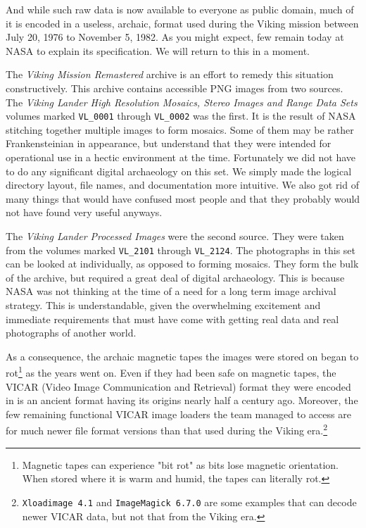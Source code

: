 And while such raw data is now available to everyone as public domain, much of it is encoded in a useless, archaic, format used during the Viking mission between July 20, 1976 to November 5, 1982. As you might expect, few remain today at NASA to explain its specification. We will return to this in a moment.

The {\it Viking Mission Remastered} archive is an effort to remedy this situation constructively. This archive contains accessible PNG images from two sources. The {\it Viking Lander High Resolution Mosaics, Stereo Images and Range Data Sets} volumes marked {\tt VL_0001} through {\tt VL_0002} was the first. It is the result of NASA stitching together multiple images to form mosaics. Some of them may be rather Frankensteinian in appearance, but understand that they were intended for operational use in a hectic environment at the time. Fortunately we did not have to do any significant digital archaeology on this set. We simply made the logical directory layout, file names, and documentation more intuitive. We also got rid of many things that would have confused most people and that they probably would not have found very useful anyways.

The {\it Viking Lander Processed Images} were the second source. They were taken from the volumes marked {\tt VL_2101} through {\tt VL_2124}. The photographs in this set can be looked at individually, as opposed to forming mosaics. They form the bulk of the archive, but required a great deal of digital archaeology. This is because NASA was not thinking at the time of a need for a long term image archival strategy. This is understandable, given the overwhelming excitement and immediate requirements that must have come with getting real data and real photographs of another world.

    {}

As a consequence, the archaic magnetic tapes the images were stored on began to rot\footnote{Magnetic tapes can experience "bit rot" as bits lose magnetic orientation. When stored where it is warm and humid, the tapes can literally rot.} as the years went on. Even if they had been safe on magnetic tapes, the VICAR (Video Image Communication and Retrieval) format they were encoded in is an ancient format having its origins nearly half a century ago. Moreover, the few remaining functional VICAR image loaders the team managed to access are for much newer file format versions than that used during the Viking era.\footnote{{\tt Xloadimage 4.1} and {\tt ImageMagick 6.7.0} are some examples that can decode newer VICAR data, but not that from the Viking era.}

